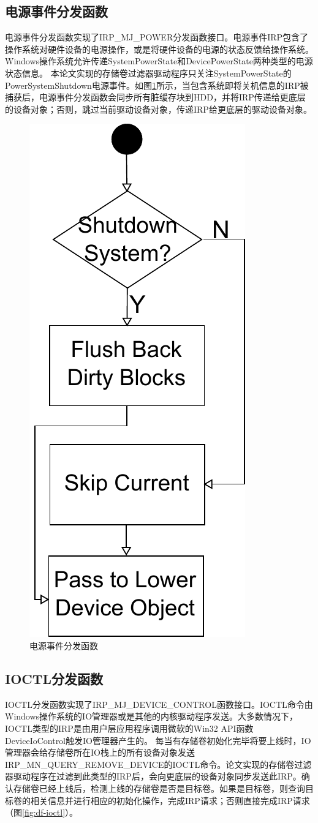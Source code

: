 \subsection{电源事件分发函数}

电源事件分发函数实现了IRP\_MJ\_POWER分发函数接口。电源事件IRP包含了操作系统对硬件设备的电源操作，或是将硬件设备的电源的状态反馈给操作系统。
Windows操作系统允许传递SystemPowerState和DevicePowerState两种类型的电源状态信息。
本论文实现的存储卷过滤器驱动程序只关注SystemPowerState的PowerSystemShutdown电源事件。如图\ref{fig:df-power}所示，当包含系统即将关机信息的IRP被捕获后，电源事件分发函数会同步所有脏缓存块到HDD，并将IRP传递给更底层的设备对象；否则，跳过当前驱动设备对象，传递IRP给更底层的驱动设备对象。

\begin{figure}[H]
\centering
\includegraphics[width=0.3\linewidth]{./graph/df-power}
\caption{电源事件分发函数}
\label{fig:df-power}
\end{figure}

\subsection{IOCTL分发函数}

IOCTL分发函数实现了IRP\_MJ\_DEVICE\_CONTROL函数接口。IOCTL命令由Windows操作系统的IO管理器或是其他的内核驱动程序发送。大多数情况下，IOCTL类型的IRP是由用户层应用程序调用微软的Win32 API函数DeviceIoControl触发IO管理器产生的。
每当有存储卷初始化完毕将要上线时，IO管理器会给存储卷所在IO栈上的所有设备对象发送IRP\_MN\_QUERY\_REMOVE\_DEVICE的IOCTL命令。论文实现的存储卷过滤器驱动程序在过滤到此类型的IRP后，会向更底层的设备对象同步发送此IRP。确认存储卷已经上线后，检测上线的存储卷是否是目标卷。如果是目标卷，则查询目标卷的相关信息并进行相应的初始化操作，完成IRP请求；否则直接完成IRP请求（图\ref{fig:df-ioctl}）。

